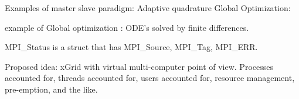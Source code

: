  
 Examples of master slave paradigm:
 Adaptive quadrature
 Global Optimization:  
 
 example of Global optimization : ODE's solved by finite differences.  
 
 MPI_Status is a struct that has MPI_Source, MPI_Tag, MPI_ERR.  
 
 
 
 
 Proposed idea:  xGrid with virtual multi-computer point of view.  Processes accounted for, threads accounted for, users accounted for, resource management, pre-emption, and the like.  